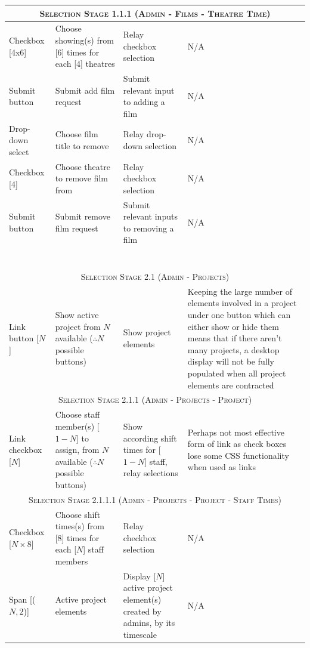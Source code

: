 \documentclass[11pt, english]{article}
\begin{document}
\begin{center}
\begin{longtable}{p{3cm}p{3cm}p{4cm}p{3cm}}
		\hline
		\multicolumn{4}{c}{\textsc{Selection Stage 1.1.1 (Admin - Films - Theatre Time)}}\\
		\hline
		Checkbox [4x6] & Choose showing(s) from [6] times for each [4] theatres & Relay checkbox selection & N/A\\
		\hline
		Submit button & Submit add film request & Submit relevant input to adding a film & N/A\\
		Drop-down select & Choose film title to remove & Relay drop-down selection & N/A\\
		Checkbox [4] & Choose theatre to remove film from & Relay checkbox selection & N/A\\
		Submit button & Submit remove film request & Submit relevant inputs to removing a film & N/A\\
		\\\\\\\\\\\\\\
		\hline
		\multicolumn{4}{c}{\textsc{Selection Stage 2.1 (Admin - Projects)}}\\
		\hline
		Link button [$N$] & Show active project from $N$ available ($\therefore N$ possible buttons) & Show project elements & Keeping the large number of elements involved in a project under one button which can either show or hide them means that if there aren't many projects, a desktop display will not be fully populated when all project elements are contracted\\
		\hline
		\multicolumn{4}{c}{\textsc{Selection Stage 2.1.1 (Admin - Projects - Project)}}\\
		\hline
		Link checkbox [$N$] & Choose staff member(s) [$1-N$] to assign, from $N$ available ($\therefore N$ possible buttons) & Show according shift times for [$1-N$] staff, relay selections & Perhaps not most effective form of link as check boxes lose some CSS functionality when used as links\\
		\hline
		\multicolumn{4}{c}{\textsc{Selection Stage 2.1.1.1 (Admin - Projects - Project - Staff Times)}}\\
		\hline
		Checkbox [$N\times8$] & Choose shift times(s) from [8] times for each [$N$] staff members & Relay checkbox selection & N/A\\
		\hline
		Span [($N,2$)] & Active project elements & Display [$N$] active project element(s) created by admins, by its timescale & N/A\\

\end{longtable}
\end{center}
\end{document}
